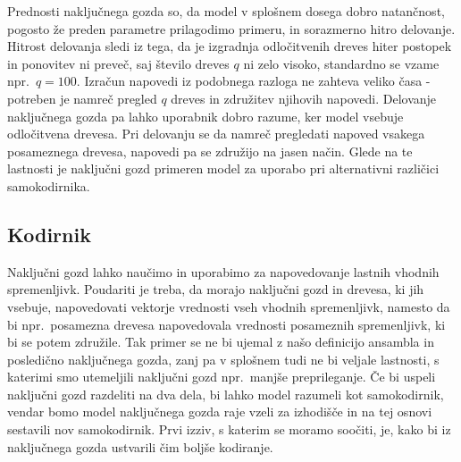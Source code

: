 \documentclass[12pt,a4paper,twoside]{article}
\theoremstyle{definition} %
\theoremstyle{plain} %
\numberwithin{equation}{section}  %
\begin{document}


Prednosti naključnega gozda so, da model v splošnem dosega dobro natančnost, pogosto že preden parametre prilagodimo primeru, in sorazmerno hitro delovanje. 
Hitrost delovanja sledi iz tega, da je izgradnja odločitvenih dreves hiter postopek in ponovitev ni preveč, saj število dreves $q$ ni zelo visoko, standardno se vzame npr.\ $q = 100$. 
Izračun napovedi iz podobnega razloga ne zahteva veliko časa - potreben je namreč pregled $q$ dreves in združitev njihovih napovedi. 
Delovanje naključnega gozda pa lahko uporabnik dobro razume, ker model vsebuje odločitvena drevesa. 
Pri delovanju se da namreč pregledati napoved vsakega posameznega drevesa, napovedi pa se združijo na jasen način. 
Glede na te lastnosti je naključni gozd primeren model za uporabo pri alternativni različici samokodirnika.



\subsection{Kodirnik}

Naključni gozd lahko naučimo in uporabimo za napovedovanje lastnih vhodnih spremenljivk. 
Poudariti je treba, da morajo naključni gozd in drevesa, ki jih vsebuje, napovedovati vektorje vrednosti vseh vhodnih spremenljivk, namesto da bi npr.\ 
posamezna drevesa napovedovala vrednosti posameznih spremenljivk, ki bi se potem združile. 
Tak primer se ne bi ujemal z našo definicijo ansambla in posledično naključnega gozda, zanj pa v splošnem tudi ne bi veljale lastnosti, s katerimi smo utemeljili naključni gozd npr.\ manjše preprileganje. 
Če bi uspeli naključni gozd razdeliti na dva dela, bi lahko model razumeli kot samokodirnik, vendar bomo model naključnega gozda raje vzeli za izhodišče in na tej osnovi sestavili nov samokodirnik. 
Prvi izziv, s katerim se moramo soočiti, je, kako bi iz naključnega gozda ustvarili čim boljše kodiranje.
\end{document}
